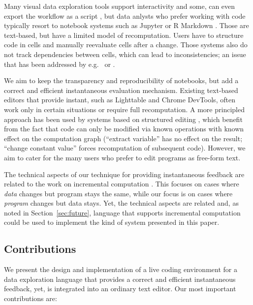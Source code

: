 \documentclass[acmsmall,anonymous,fleqn]{acmart}\settopmatter{printfolios=false,printccs=false,printacmref=false}
\theoremstyle{plain}
\theoremstyle{definition}
\begin{document}
Many visual data exploration tools support interactivity \cite{control,tableau,vizdom} and some,
can even export the workflow as a script \cite{wrangler}, but data anlysts who prefer working with
code typically resort to notebook systems such as Jupyter or R Markdown \cite{jupyter,rmarkdown}.
Those are text-based, but have a limited model of recomputation. Users have to structure code in
cells and manually reevaluate cells after a change. Those systems also do not track
dependencies between cells, which can lead to inconsistencies; an issue that has been addressed
by e.g.~\citet{dataflow} or \citet{wrattler}.

We aim to keep the transparency and reproducibility of notebooks, but add a correct and
efficient instantaneous evaluation mechanism. Existing text-based editors that provide instant,
such as Lighttable \cite{lighttable} and Chrome DevTools, often work only in certain
situations or require full recomputation. A more principled approach has been used by
systems based on structured editing \cite{livenut,lamdu}, which benefit from the fact that code
can only be modified via known operations with known effect on the computation graph
(``extract variable'' has no effect on the result; ``change constant value''
forces recomputation of subsequent code). However, we aim to cater for the many users who
prefer to edit programs as free-form text.

The technical aspects of our technique for providing instantaneous feedback
are related to the work on incremental computation \cite{selfadjusting,incremental}. This focuses
on cases where \emph{data} changes but program stays the same, while our focus is on cases where
\emph{program} changes but data stays. Yet, the technical aspects are related and,
as noted in Section~\ref{sec:future}, language that supports incremental computation could be used
to implement the kind of system presented in this paper.

\subsection{Contributions}
We present the design and implementation of a live coding environment for a data exploration
language that provides a correct and efficient instantaneous feedback, yet, is integrated into an
ordinary text editor. Our most important contributions are:
\end{document}
